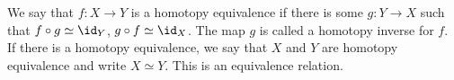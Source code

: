 We say that $f\colon X\to Y$ is a homotopy equivalence if there is some
$g\colon Y\to X$ such that $f\circ g\simeq \id_Y$, $g \circ f\simeq \id_X$.
The map  $g$ is called a homotopy inverse for $f$. If there is a homotopy
equivalence, we say that $X$ and $Y$ are homotopy equivalence and write
$X\simeq Y$. This is an equivalence relation.
